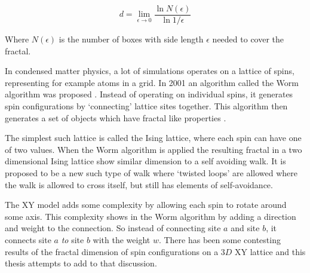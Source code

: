 \begin{equation}
    d = \lim_{\epsilon \to 0} \frac{\ln N(\epsilon)}{\ln 1 / \epsilon}
\end{equation}

Where $N(\epsilon)$ is the number of boxes with side length $\epsilon$ needed to cover the fractal.

In condensed matter physics, a lot of simulations operates on a lattice of spins, representing for example atoms in a grid. In 2001 an algorithm called the Worm algorithm was proposed \cite{Prokofev:first_worm_algorithm}. Instead of operating on individual spins, it generates spin configurations by `connecting' lattice sites together. This algorithm then generates a set of objects which have fractal like properties \cite{Duplantier:GeoHausdorff}.

The simplest such lattice is called the Ising lattice, where each spin can have one of two values. When the Worm algorithm is applied the resulting fractal in a two dimensional Ising lattice show similar dimension to a self avoiding walk. It is proposed to be a new such type of walk where `twisted loops' are allowed where the walk is allowed to cross itself, but still has elements of self-avoidance.

The XY model adds some complexity by allowing each spin to rotate around some axis. This complexity shows in the Worm algorithm by adding a direction and weight to the connection. So instead of connecting site $a$ and site $b$, it connects site $a$ \textit{to} site $b$ with the weight $w$. There has been some contesting results of the fractal dimension of spin configurations on a $3D$ XY lattice \cite{Prokofev:comment_on_hove_hausdorff_crit_fluct}\cite{Hove:hausdorff_crit_fluctuations} and this thesis attempts to add to that discussion. 













